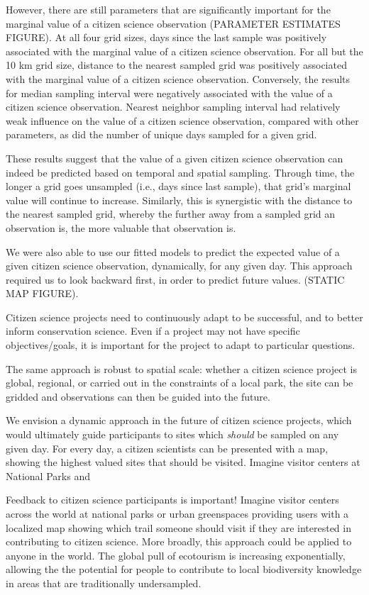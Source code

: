 \documentclass[9pt,twocolumn,twoside,lineno]{pnas-new}
\begin{document}
However, there are still parameters that are significantly important for the marginal value of a citizen science observation (PARAMETER ESTIMATES FIGURE). At all four grid sizes, days since the last sample was positively associated with the marginal value of a citizen science observation. For all but the 10 km grid size, distance to the nearest sampled grid was positively associated with the marginal value of a citizen science observation. Conversely, the results for median sampling interval were negatively associated with the value of a citizen science observation. Nearest neighbor sampling interval had relatively weak influence on the value of a citizen science observation, compared with other parameters, as did the number of unique days sampled for a given grid.

These results suggest that the value of a given citizen science observation can indeed be predicted based on temporal and spatial sampling. Through time, the longer a grid goes unsampled (i.e., days since last sample), that grid's marginal value will continue to increase. Similarly, this is synergistic with the distance to the nearest sampled grid, whereby the further away from a sampled grid an observation is, the more valuable that observation is.

We were also able to use our fitted models to predict the expected value of a given citizen science observation, dynamically, for any given day. This approach required us to look backward first, in order to predict future values. (STATIC MAP FIGURE).


Citizen science projects need to continuously adapt to be successful, and to better inform conservation science. Even if a project may not have specific objectives/goals, it is important for the project to adapt to particular questions.

The same approach is robust to spatial scale: whether a citizen science project is global, regional, or carried out in the constraints of a local park, the site can be gridded and observations can then be guided into the future.


We envision a dynamic approach in the future of citizen science projects, which would ultimately guide participants to sites which \textit{should} be sampled on any given day. For every day, a citizen scientists can be presented with a map, showing the highest valued sites that should be visited. Imagine visitor centers at National Parks and

Feedback to citizen science participants is important! Imagine visitor centers across the world at national parks or urban greenspaces providing users with a localized map showing which trail someone should visit if they are interested in contributing to citizen science. More broadly, this approach could be applied to anyone in the world. The global pull of ecotourism is increasing exponentially, allowing the the potential for people to contribute to local biodiversity knowledge in areas that are traditionally undersampled.
\end{document}
